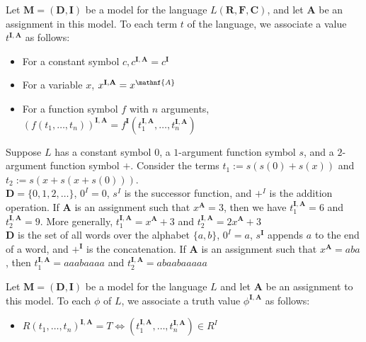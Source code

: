 \documentclass[a4paper]{article}
\theoremstyle{plain}
\theoremstyle{definition}
\newtheorem{defn}{Definition}[section]
\theoremstyle{remark}
\begin{document}
\begin{tcolorbox}[colback=black!3!white,colframe=black!60!white,title=\begin{defn}Values of terms \label{Values of terms}\end{defn}]
Let $\mathbf{M} = (\mathbf{D},\mathbf{I})$ be a model for the language $L(\mathbf{R},\mathbf{F},\mathbf{C})$, and let $\mathbf{A}$ be an assignment in this model. To each term $t$ of the language, we associate a value $t^{\mathbf{I},\mathbf{A}}$ as follows:
\begin{itemize}
	\item For a constant symbol $c, c^{\mathbf{I},\mathbf{A}} = c^{\mathbf{I}}$ 
	\item For a variable $x$, $x^{\mathbf{I},\mathbf{A}} = x^{\mathnf{A}}$
	\item For a function symbol  $f$ with $n$ arguments, $(f(t_1,\ldots,t_n))^{\mathbf{I},\mathbf{A}} = f^{\mathbf{I}}(t_1^{\mathbf{I},\mathbf{A}},\ldots,t_n^{\mathbf{I},\mathbf{A}})$
\end{itemize}
\end{tcolorbox}
\begin{tcolorbox}[colback=black!3!white,colframe=black!60!white,title=\begin{defn}Example \label{Example}\end{defn}]
Suppose $L$ has a constant symbol $0$, a $1$-argument function symbol $s$, and a $2$-argument function symbol $+$. Consider the terms $t_1 := s(s(0)+s(x))$ and $t_2 := s(x+s(x+s(0)))$. \\
$\mathbf{D} = \{0,1,2,\ldots \}$, $0^{I}=0$, $s^{I}$ is the successor function, and $+^{I}$ is the addition operation. If $\mathbf{A}$ is an assignment such that $x^{\mathbf{A}} = 3$, then we have $t_1^{\mathbf{I},\mathbf{A}} = 6$ and $t_2^{\mathbf{I},\mathbf{A}} = 9$. More generally, $t_1^{\mathbf{I},\mathbf{A}} = x^{\mathbf{A}} +3$ and $t_2^{\mathbf{I},\mathbf{A}} = 2 x^{\mathbf{A}}+3$ \\
$\mathbf{D}$ is the set of all words over the alphabet $\{a,b \}$, $0 ^{I}= a$, $s^{\mathbf{I}}$ appends $a$ to the end of a word, and $+^{\mathbf{I}}$ is the concatenation. If $\mathbf{A}$ is an assignment such that $x^{\mathbf{A}} = aba$ , then $t_1^{\mathbf{I},\mathbf{A}} = aaabaaaa$ and $t_2^{\mathbf{I},\mathbf{A}}=abaabaaaaa$
\end{tcolorbox}
\begin{tcolorbox}[colback=black!3!white,colframe=black!60!white,title=\begin{defn}Truth of formulas \label{Truth of formulas}\end{defn}]
Let $\mathbf{M} = (\mathbf{D},\mathbf{I})$ be a model for the language $L$ and let $\mathbf{A}$ be an assignment to this model. To each $\phi$ of $L$, we associate a truth value $\phi^{\mathbf{I},\mathbf{A}}$ as follows:
\begin{itemize}
	\item $R(t_1,\ldots,t_n)^{\mathbf{I},\mathbf{A}} = T \iff (t_1^{\mathbf{I},\mathbf{A}},\ldots,t_n^{\mathbf{I},\mathbf{A}})\in R^{I}$
\end{itemize}

\end{tcolorbox}
\end{document}
